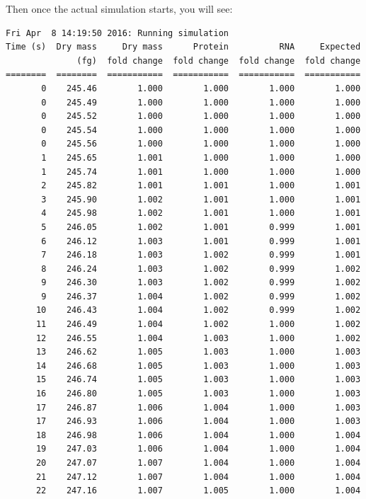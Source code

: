 \documentclass[12pt]{article}
\begin{document}
\hfill \break

Then once the actual simulation starts, you will see:

\hfill \break

\begin{lstlisting}
Fri Apr  8 14:19:50 2016: Running simulation
Time (s)  Dry mass     Dry mass      Protein          RNA     Expected
              (fg)  fold change  fold change  fold change  fold change
========  ========  ===========  ===========  ===========  ===========
       0    245.46        1.000        1.000        1.000        1.000
       0    245.49        1.000        1.000        1.000        1.000
       0    245.52        1.000        1.000        1.000        1.000
       0    245.54        1.000        1.000        1.000        1.000
       0    245.56        1.000        1.000        1.000        1.000
       1    245.65        1.001        1.000        1.000        1.000
       1    245.74        1.001        1.000        1.000        1.000
       2    245.82        1.001        1.001        1.000        1.001
       3    245.90        1.002        1.001        1.000        1.001
       4    245.98        1.002        1.001        1.000        1.001
       5    246.05        1.002        1.001        0.999        1.001
       6    246.12        1.003        1.001        0.999        1.001
       7    246.18        1.003        1.002        0.999        1.001
       8    246.24        1.003        1.002        0.999        1.002
       9    246.30        1.003        1.002        0.999        1.002
       9    246.37        1.004        1.002        0.999        1.002
      10    246.43        1.004        1.002        0.999        1.002
      11    246.49        1.004        1.002        1.000        1.002
      12    246.55        1.004        1.003        1.000        1.002
      13    246.62        1.005        1.003        1.000        1.003
      14    246.68        1.005        1.003        1.000        1.003
      15    246.74        1.005        1.003        1.000        1.003
      16    246.80        1.005        1.003        1.000        1.003
      17    246.87        1.006        1.004        1.000        1.003
      17    246.93        1.006        1.004        1.000        1.003
      18    246.98        1.006        1.004        1.000        1.004
      19    247.03        1.006        1.004        1.000        1.004
      20    247.07        1.007        1.004        1.000        1.004
      21    247.12        1.007        1.004        1.000        1.004
      22    247.16        1.007        1.005        1.000        1.004

\end{lstlisting}
\end{document}
